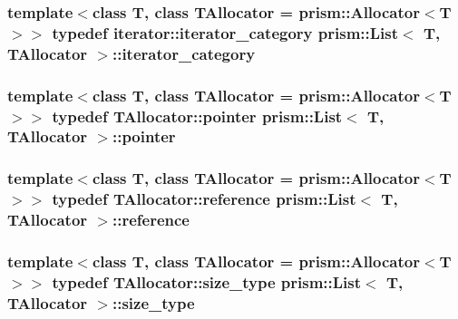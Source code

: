 \subsubsection[{\texorpdfstring{iterator\+\_\+category}{iterator_category}}]{\setlength{\rightskip}{0pt plus 5cm}template$<$class T, class T\+Allocator = prism\+::\+Allocator$<$\+T$>$$>$ typedef iterator\+::iterator\+\_\+category {\bf prism\+::\+List}$<$ T, T\+Allocator $>$\+::{\bf iterator\+\_\+category}}\hypertarget{classprism_1_1_list_a9cf5f64f0fa1227312b12929dd87aa8d}{}\label{classprism_1_1_list_a9cf5f64f0fa1227312b12929dd87aa8d}
\subsubsection[{\texorpdfstring{pointer}{pointer}}]{\setlength{\rightskip}{0pt plus 5cm}template$<$class T, class T\+Allocator = prism\+::\+Allocator$<$\+T$>$$>$ typedef T\+Allocator\+::pointer {\bf prism\+::\+List}$<$ T, T\+Allocator $>$\+::{\bf pointer}}\hypertarget{classprism_1_1_list_ac9c2d25c50b4ebfb02687eeb4e9668bc}{}\label{classprism_1_1_list_ac9c2d25c50b4ebfb02687eeb4e9668bc}
\subsubsection[{\texorpdfstring{reference}{reference}}]{\setlength{\rightskip}{0pt plus 5cm}template$<$class T, class T\+Allocator = prism\+::\+Allocator$<$\+T$>$$>$ typedef T\+Allocator\+::reference {\bf prism\+::\+List}$<$ T, T\+Allocator $>$\+::{\bf reference}}\hypertarget{classprism_1_1_list_a87113fe9cf2580e395e3d9f2962f4e81}{}\label{classprism_1_1_list_a87113fe9cf2580e395e3d9f2962f4e81}
\subsubsection[{\texorpdfstring{size\+\_\+type}{size_type}}]{\setlength{\rightskip}{0pt plus 5cm}template$<$class T, class T\+Allocator = prism\+::\+Allocator$<$\+T$>$$>$ typedef T\+Allocator\+::size\+\_\+type {\bf prism\+::\+List}$<$ T, T\+Allocator $>$\+::{\bf size\+\_\+type}}\hypertarget{classprism_1_1_list_a1dbc0ff68e25381f32639b7ba2ba390d}{}\label{classprism_1_1_list_a1dbc0ff68e25381f32639b7ba2ba390d}
